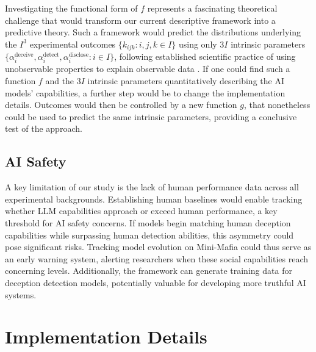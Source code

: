 \documentclass{article}
\begin{document}
Investigating the functional form of $f$ represents a fascinating theoretical challenge that would transform our current descriptive framework into a predictive theory. Such a framework would predict the distributions underlying the $I^3$ experimental outcomes $\{k_{ijk}:i,j,k\in I\}$ using only $3I$ intrinsic parameters $\{\alpha_i^{\text{deceive}},\alpha_i^{\text{detect}},\alpha_i^{\text{disclose}}:i\in I\}$, following established scientific practice of using unobservable properties to explain observable data \citep{bunge1973philosophy}. If one could find such a function $f$ and the $3I$ intrinsic parameters quantitatively describing the AI models' capabilities, a further step would be to change the implementation details. Outcomes would then be controlled by a new function $g$, that nonetheless could be used to predict the same intrinsic parameters, providing a conclusive test of the approach.


\subsection{AI Safety}

A key limitation of our study is the lack of human performance data across all experimental backgrounds. Establishing human baselines would enable tracking whether LLM capabilities approach or exceed human performance, a key threshold for AI safety concerns. If models begin matching human deception capabilities while surpassing human detection abilities, this asymmetry could pose significant risks. Tracking model evolution on Mini-Mafia could thus serve as an early warning system, alerting researchers when these social capabilities reach concerning levels. Additionally, the framework can generate training data for deception detection models, potentially valuable for developing more truthful AI systems.










\appendix

\section{Implementation Details}
\label{appendix:experimental_details}
\end{document}
